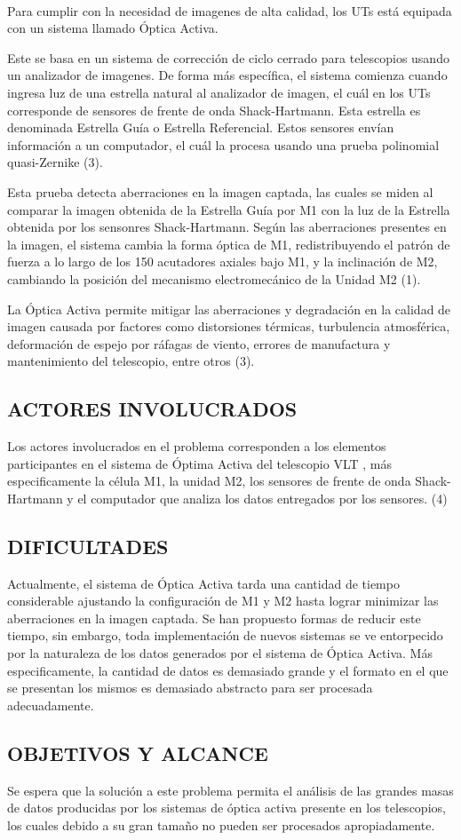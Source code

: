 \\

Para cumplir con la necesidad de imagenes de alta calidad, los UTs está equipada con un sistema llamado Óptica Activa. 

Este se basa en un sistema de corrección de ciclo cerrado para telescopios usando un analizador de imagenes.
De forma más específica, el sistema comienza cuando ingresa luz de una estrella natural al analizador de imagen, el cuál en los UTs corresponde de sensores de frente de onda Shack-Hartmann. Esta estrella es denominada Estrella Guía o Estrella Referencial.
Estos sensores envían información a un computador, el cuál la procesa usando una prueba polinomial quasi-Zernike (3).

Esta prueba detecta aberraciones en la imagen captada, las cuales se miden al comparar la imagen obtenida de la Estrella Guía por M1 con la luz de la Estrella obtenida por los sensonres Shack-Hartmann.
Según las aberraciones presentes en la imagen, el sistema cambia la forma óptica de M1, redistribuyendo el patrón de fuerza a lo largo de los 150 acutadores axiales bajo M1, y la inclinación de M2, cambiando la posición del mecanismo electromecánico de la Unidad M2 (1).

La Óptica Activa permite mitigar las aberraciones y degradación en la calidad de imagen causada por factores como distorsiones térmicas, turbulencia atmosférica, deformación de espejo por ráfagas de viento,
errores de manufactura y mantenimiento del telescopio, entre otros (3).

\subsection{ACTORES INVOLUCRADOS}

Los actores involucrados en el problema corresponden a los elementos participantes en el sistema de Óptima Activa del telescopio VLT , más especificamente
la célula M1, la unidad M2, los sensores de frente de onda Shack-Hartmann y el computador que analiza los datos entregados por los sensores. (4)

\subsection{DIFICULTADES}

Actualmente, el sistema de Óptica Activa tarda una cantidad de tiempo considerable ajustando la configuración de M1 y M2 hasta lograr minimizar las aberraciones en la imagen captada.
Se han propuesto formas de reducir este tiempo, sin embargo, toda implementación de nuevos sistemas se ve entorpecido por la naturaleza de los datos generados por el 
sistema de Óptica Activa.
Más especificamente, la cantidad de datos es demasiado grande y el formato en el que se presentan los mismos es demasiado abstracto para ser procesada adecuadamente.

\subsection{OBJETIVOS Y ALCANCE}

Se espera que la solución a este problema permita el análisis de las grandes masas de datos producidas por los
sistemas de óptica activa presente en los telescopios, los cuales debido a su gran tamaño no pueden ser procesados
apropiadamente.